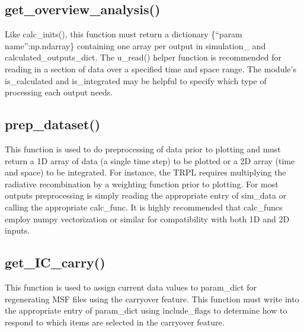 \documentclass[11pt,letterpaper,titlepage]{article}
\begin{document}
		\subsection{get\_overview\_analysis()}
		\par Like calc\_inits(), this function must return a dictionary \{“param name”:np.ndarray\} containing one array per output in simulation\_ and calculated\_outputs\_dict. The u\_read() helper function is recommended for reading in a section of data over a specified time and space range. The module’s is\_calculated and is\_integrated may be helpful to specify which type of processing each output needs.
		
		\subsection{prep\_dataset()}
		\par This function is used to do preprocessing of data prior to plotting and must return a 1D array of data (a single time step) to be plotted or a 2D array (time and space) to be integrated. For instance, the TRPL requires multiplying the radiative recombination by a weighting function prior to plotting. For most outputs preprocessing is simply reading the appropriate entry of sim\_data or calling the appropriate calc\_func. It is highly recommended that calc\_funcs employ numpy vectorization or similar for compatibility with both 1D and 2D inputs.
		
		\subsection{get\_IC\_carry()}
		\par This function is used to assign current data values to param\_dict for regenerating MSF files using the carryover feature. This function must write into the appropriate entry of param\_dict using include\_flags to determine how to respond to which items are selected in the carryover feature.
\end{document}
